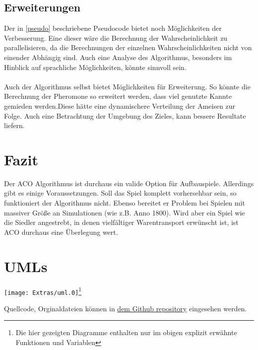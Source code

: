 \documentclass[12pt]{article}
\begin{document}
\subsection{Erweiterungen}
Der in \ref{pseudo} beschriebene Pseudocode bietet noch Möglichkeiten der Verbesserung.
Eine dieser wäre die Berechnung der Wahrscheinlichkeit zu parallelisieren, da die Berechnungen der einzelnen Wahrscheinlichkeiten nicht von einender Abhängig sind. Auch eine Analyse des Algorithmus, besonders im Hinblick auf sprachliche Möglichkeiten, könnte sinnvoll sein.\\\\
Auch der Algorithmus selbst bietet Möglichkeiten für Erweiterung. So könnte die Berechnung der Pheromone so erweitert werden, dass viel genutzte Kannte gemieden werden.Diese hätte eine dynamischere Verteilung der Ameisen zur Folge. Auch eine Betrachtung der Umgebung des Zieles, kann bessere Resultate liefern.
\section{Fazit}
Der ACO Algorithmus ist durchaus ein valide Option für Aufbauspiele. Allerdings gibt es einige Voraussetzungen. Soll das Spiel komplett vorhersehbar sein, so funktioniert der Algorithmus nicht. Ebenso bereitet er Problem bei Spielen mit massiver Größe an Simulationen (wie z.B. Anno 1800).
Wird aber ein Spiel wie die Siedler angestrebt, in denen vielfältiger Warentransport erwünscht ist, ist ACO durchaus eine Überlegung wert.


\section{UMLs}
\begin{center}
\texttt{[image: Extras/uml.0]}\footnote{Die hier gezeigten Diagramme enthalten nur im obigen explizit erwähnte Funktionen und Variablen}
\end{center}
\nocite{*}
\printbibliography[heading=bibnumbered]
Quellcode, Orginaldateien können in \href{https://github.com/Kauruck/Facharbeit_AOC}{dem Github repository} eingesehen werden.
\end{document}
